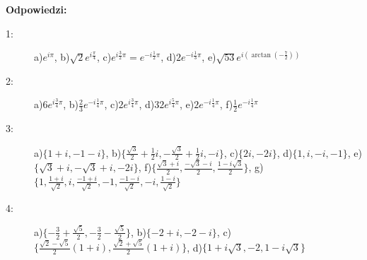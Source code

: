 \documentclass{article}
\begin{document}
\newpage
\textbf{Odpowiedzi:}
\begin{description}
    \item [1:] a)$e^{i\pi}$, b)$\sqrt{2}e^{i\frac{\pi}{4}}$, c)$e^{i\frac{3}{2}\pi}=e^{-i\frac{1}{2}\pi}$, d)$2e^{-i\frac{1}{3}\pi}$, e)$\sqrt{53}e^{i(\arctan{(-\frac{7}{2})})}$
    \item [2:] a)$6e^{i\frac{3}{4}\pi}$, b)$\frac{2}{3}e^{-i\frac{1}{4}\pi}$, c)$2e^{i\frac{3}{4}\pi}$, d)$32e^{i\frac{5}{4}\pi}$, e)$2e^{-i\frac{1}{4}\pi}$, f)$\frac{1}{2}e^{-i\frac{1}{4}\pi}$
    \item [3:] a)$\{ 1+i, -1-i \}$, b)$\{ \frac{\sqrt{3}}{2} + \frac{1}{2}i, -\frac{\sqrt{3}}{2} + \frac{1}{2}i, -i \}$, c)$\{ 2i, -2i \}$, d)$\{ 1, i, -i, -1 \}$, e)$\{ \sqrt{3} + i, -\sqrt{3} + i, -2i \}$, f)$\{ \frac{\sqrt{3}+i}{2}, \frac{-\sqrt{3}-i}{2}, \frac{1 - i\sqrt{3}}{2} \}$, g)$\{ 1, \frac{1+i}{\sqrt{2}}, i, \frac{-1+i}{\sqrt{2}}, -1, \frac{-1-i}{\sqrt{2}}, -i, \frac{1-i}{\sqrt{2}} \}$
    \item [4:] a)$\{ -\frac{3}{2} + \frac{\sqrt{5}}{2}, -\frac{3}{2} - \frac{\sqrt{5}}{2} \}$, b)$\{ -2+i, -2-i \}$, c)$\{ \frac{\sqrt{2} - \sqrt{5}}{2} (1 + i), \frac{\sqrt{2} + \sqrt{5}}{2} (1 + i) \}$, d)$\{ 1+i\sqrt{3}, -2, 1-i\sqrt{3} \}$
\end{description}
\end{document}
